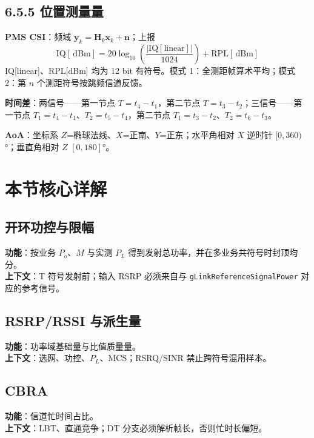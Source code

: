 \documentclass[11pt,a4paper]{ctexart}
\newcommand{\dBm}{\,\mathrm{dBm}}
\begin{document}
\subsection{6.5.5 位置测量量}

\textbf{PMS CSI}：频域 $\mathbf{y}_k=\mathbf{H}_k\mathbf{x}_k+\mathbf{n}$；上报
\begin{equation}
\mathrm{IQ[\dBm]} = 20\log_{10}\!\left(\frac{|\mathrm{IQ[linear]}|}{1024}\right) + \mathrm{RPL[\dBm]}
\label{eq:iqdbm}
\end{equation}
IQ[linear]、RPL[dBm] 均为 12 bit 有符号。模式 1：全测距帧算术平均；模式 2：第 $n$ 个测距符号按跳频信道反馈。

\textbf{时间差}：两信号——第一节点 $T=t_4-t_1$，第二节点 $T=t_3-t_2$；三信号——第一节点 $T_1=t_4-t_1$、$T_2=t_5-t_4$，第二节点 $T_1=t_3-t_2$、$T_2=t_6-t_3$。

\textbf{AoA}：坐标系 $Z$=椭球法线、$X$=正南、$Y$=正东；水平角相对 $X$ 逆时针 $[0,360)$°；垂直角相对 $Z$ $[0,180]$°。

\section{本节核心详解}

\subsection{开环功控与限幅}

\textbf{功能}：按业务 $P_o$、$M$ 与实测 $P_L$ 得到发射总功率，并在多业务共符号时封顶均分。\\
\textbf{上下文}：T 符号发射前；输入 RSRP 必须来自与 \texttt{gLinkReferenceSignalPower} 对应的参考信号。

\subsection{RSRP/RSSI 与派生量}

\textbf{功能}：功率域基础量与比值质量量。\\
\textbf{上下文}：选网、功控、$P_L$、MCS；RSRQ/SINR 禁止跨符号混用样本。

\subsection{CBRA}

\textbf{功能}：信道忙时间占比。\\
\textbf{上下文}：LBT、直通竞争；DT 分支必须解析帧长，否则忙时长偏短。
\end{document}
